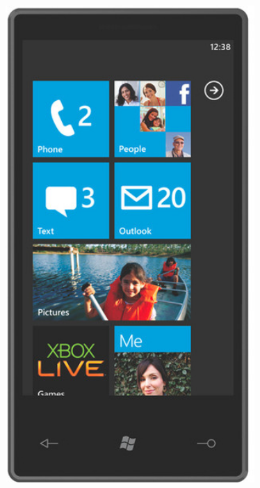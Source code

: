 \documentclass{beamer}
\begin{document}
\begin{frame}
\begin{columns}
\begin{column}{0.3 \textwidth}
		\end{column}
		\begin{column}{0.3 \textwidth}
		\pause
			\begin{figure}
			\centering
				\includegraphics[width=1.00\textwidth]{img/windowsPhone.jpg}
			\label{fig:iphone}
		\end{figure}
		\end{column}
	\end{columns}
\end{frame}
\end{document}
